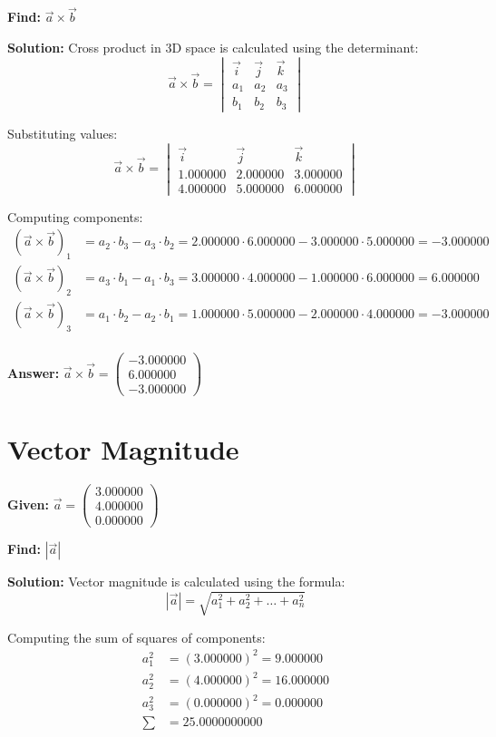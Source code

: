 \documentclass{article}
\begin{document}
\textbf{Find:} $\vec{a} \times \vec{b}$

\textbf{Solution:}
Cross product in 3D space is calculated using the determinant:
\[
\vec{a} \times \vec{b} = \begin{vmatrix} \vec{i} & \vec{j} & \vec{k} \\ a_1 & a_2 & a_3 \\ b_1 & b_2 & b_3 \end{vmatrix}
\]

Substituting values:
\[
\vec{a} \times \vec{b} = \begin{vmatrix} \vec{i} & \vec{j} & \vec{k} \\ 1.000000 & 2.000000 & 3.000000 \\ 4.000000 & 5.000000 & 6.000000 \end{vmatrix}
\]

Computing components:
\begin{align*}
(\vec{a} \times \vec{b})_1 &= a_2 \cdot b_3 - a_3 \cdot b_2 = 2.000000 \cdot 6.000000 - 3.000000 \cdot 5.000000 = -3.000000 \\
(\vec{a} \times \vec{b})_2 &= a_3 \cdot b_1 - a_1 \cdot b_3 = 3.000000 \cdot 4.000000 - 1.000000 \cdot 6.000000 = 6.000000 \\
(\vec{a} \times \vec{b})_3 &= a_1 \cdot b_2 - a_2 \cdot b_1 = 1.000000 \cdot 5.000000 - 2.000000 \cdot 4.000000 = -3.000000 \\
\end{align*}

\textbf{Answer:} $\vec{a} \times \vec{b} = \begin{pmatrix}-3.000000 \\ 6.000000 \\ -3.000000\end{pmatrix}$
\newpage

\section*{Vector Magnitude}
\textbf{Given:}
$\vec{a} = \begin{pmatrix}3.000000 \\ 4.000000 \\ 0.000000\end{pmatrix}$

\textbf{Find:} $|\vec{a}|$

\textbf{Solution:}
Vector magnitude is calculated using the formula:
\[
|\vec{a}| = \sqrt{a_1^2 + a_2^2 + \ldots + a_n^2}
\]

Computing the sum of squares of components:
\begin{align*}
a_{1}^2 &= (3.000000)^2 = 9.000000 \\
a_{2}^2 &= (4.000000)^2 = 16.000000 \\
a_{3}^2 &= (0.000000)^2 = 0.000000 \\
\sum &= 25.0000000000 \\
\end{align*}
\end{document}
